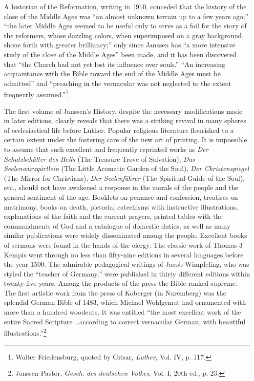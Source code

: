 A historian of the Reformation, writing in 1910, conceded that the
history of the close of the Middle Ages was “an almost unknown terrain
up to a few years ago;” “the later Middle Ages seemed to be useful only
to serve as a foil for the story of the reformers, whose dazzling colors,
when superimposed on a gray background, shone forth with greater brilliancy;”
only since Janssen has “a more intensive study of the close of the
Middle Ages” been made, and it has been discovered that “the Church had
not yet lost its influence over souls.” “An increasing acquaintance with the
Bible toward the end of the Middle Ages must be admitted” and “preaching
in the vernacular was not neglected to the extent frequently assumed.”\footnote
{Walter Friedensburg, quoted by Grisar, \textit{Luther}, Vol. IV, p. 117.}

The first volume of Janssen’s History, despite the necessary modifications
made in later editions, clearly reveals that there was a
striking revival in many spheres of ecclesiastical life before Luther.
Popular religious literature flourished to a certain extent under the
fostering care of the new art of printing. It is impossible to assume
that such excellent and frequently reprinted works as \textit{Der Schatzbehälter
des Heils} (The Treasure Trove of Salvation), \textit{Das
Seelenwurzgärtlein} (The Little Aromatic Garden of the Soul), \textit{Der
Christenspiegel} (The Mirror for Christians), \textit{Der Seelenführer} (The
Spiritual Guide of the Soul), etc., should not have awakened a response
in the morals of the people and the general sentiment of the
age. Booklets on penance and confession, treatises on matrimony,
books on death, pictorial catechisms with instructive illustrations,
explanations of the faith and the current prayers, printed tables
with the commandments of God and a catalogue of domestic duties,
as well as many similar publications were widely disseminated among
the people. Excellent books of sermons were found in the hands of
the clergy. The classic work of Thomas 3 Kempis went through no
less than fifty-nine editions in several languages before the year
1500. The admirable pedagogical writings of Jacob Wimpfeling,
who was styled the “teacher of Germany,” were published in thirty
different editions within twenty-five years. Among the products of
the press the Bible ranked supreme. The first artistic work from the
press of Koberger (in Nuremberg) was the splendid German Bible
of 1483, which Michael Wohlgemut had ornamented with more than
a hundred woodcuts. It was entitled “the most excellent work of
the entire Sacred Scripture \dots according to correct vernacular German,
with beautiful illustrations.”\footnote
{Janssen-Pastor, \textit{Gesch. des deutschen Volkes}, Vol. I, 20th ed., p. 23.}

